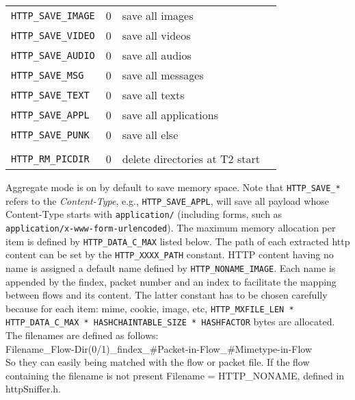 \documentclass[documentation]{subfiles}
\begin{document}
\begin{longtable}{lcll}
    {\tt HTTP\_SAVE\_IMAGE} & 0 & save all images\\
    {\tt HTTP\_SAVE\_VIDEO} & 0 & save all videos\\
    {\tt HTTP\_SAVE\_AUDIO} & 0 & save all audios\\
    {\tt HTTP\_SAVE\_MSG}   & 0 & save all messages\\
    {\tt HTTP\_SAVE\_TEXT}  & 0 & save all texts\\
    {\tt HTTP\_SAVE\_APPL}  & 0 & save all applications\\
    {\tt HTTP\_SAVE\_PUNK}  & 0 & save all else\\\\

    {\tt HTTP\_RM\_PICDIR}  & 0 & delete directories at T2 start\\
    \bottomrule
\end{longtable}
Aggregate mode is on by default to save memory space.
Note that {\tt HTTP\_SAVE\_*} refers to the {\em Content-Type}, e.g., {\tt HTTP\_SAVE\_APPL}, will save all payload whose Content-Type starts with {\tt application/} (including forms, such as \\ {\tt application/x-www-form-urlencoded}).
The maximum memory allocation per item is defined by {\tt HTTP\_DATA\_C\_MAX} listed below.
The path of each extracted http content can be set by the {\tt HTTP\_XXXX\_PATH} constant.
HTTP content having no name is assigned a default name defined by {\tt HTTP\_NONAME\_IMAGE}. Each name is
appended by the findex, packet number and an index to facilitate the mapping between flows and its content.
The latter constant has to be chosen carefully because for each item: mime, cookie, image, etc,
{\tt HTTP\_MXFILE\_LEN * HTTP\_DATA\_C\_MAX * HASHCHAINTABLE\_SIZE * HASHFACTOR} bytes are allocated.
The filenames are defined as follows:\\
Filename\_Flow-Dir(0/1)\_findex\_\#Packet-in-Flow\_\#Mimetype-in-Flow\\
So they can easily being matched with the flow or packet file. If the flow containing the filename is not present Filename = HTTP\_NONAME, defined in httpSniffer.h.
\end{document}

